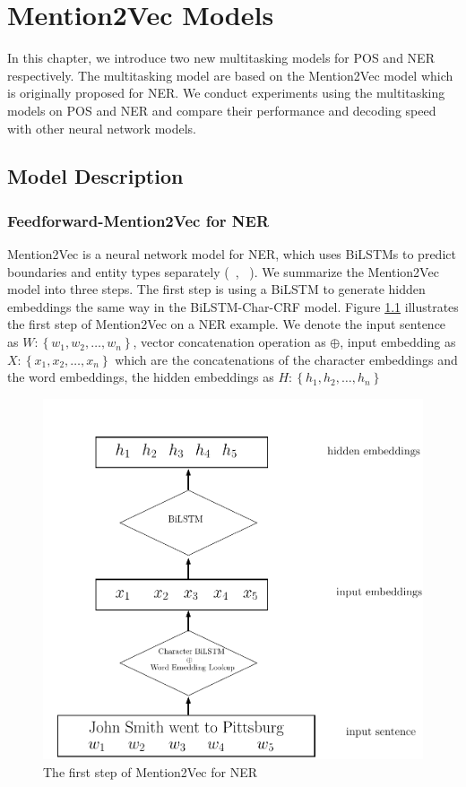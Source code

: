\chapter{Mention2Vec Models}

In this chapter, we introduce two new multitasking models for POS and NER respectively. The multitasking model are based on the Mention2Vec model which is originally proposed for NER. We conduct experiments using the multitasking models on POS and NER and compare their performance and decoding speed with other neural network models.

\section{Model Description}

\subsection{Feedforward-Mention2Vec for NER}

Mention2Vec is a neural network model for NER, which uses BiLSTMs to predict boundaries and entity types separately (~\citeauthor{stratos2016mention2vec}, ~\citeyear{stratos2016mention2vec}). We summarize the Mention2Vec model into three steps. The first step is using a BiLSTM to generate hidden embeddings the same way in the BiLSTM-Char-CRF model. Figure \ref{fig:mention2vec1} illustrates the first step of Mention2Vec on a NER example. We denote the input sentence as $W: \left\{w_{1}, w_{2}, \dots, w_{n}\right\}$, vector concatenation operation as $\oplus$, input embedding as $X: \left\{x_{1}, x_{2}, \dots, x_{n}\right\}$ which are the concatenations of the character embeddings and the word embeddings, the hidden embeddings as $H: \left\{h_{1}, h_{2}, \dots, h_{n}\right\}$

\begin{figure}
  \centering
  \includegraphics[scale=0.6]{mention2vec1.pdf}
 \caption{The first step of Mention2Vec for NER}
  \label{fig:mention2vec1}
\end{figure}

